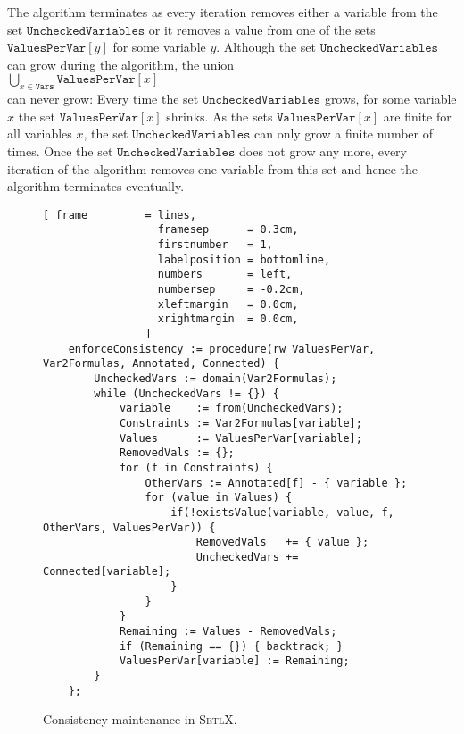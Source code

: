 The algorithm terminates as every iteration removes either a variable from the set
$\texttt{UncheckedVariables}$ or it removes a value from one of the sets $\texttt{ValuesPerVar}[y]$ for some
variable $y$.  Although the set $\texttt{UncheckedVariables}$ can grow during the algorithm,  the union
\\[0.2cm]
\hspace*{1.3cm}
$\bigcup\limits_{x \in \mathtt{Vars}} \texttt{ValuesPerVar}[x]$ 
\\[0.2cm]
can never grow:  Every time the set $\texttt{UncheckedVariables}$ grows,
for some variable $x$ the set $\texttt{ValuesPerVar}[x]$ shrinks.
As the sets $\texttt{ValuesPerVar}[x]$ are finite for all variables $x$, the set
$\texttt{UncheckedVariables}$ can only grow a finite number of times. 
Once the set $\texttt{UncheckedVariables}$ does not grow any more, every iteration of the algorithm removes one
variable from this set and hence the algorithm terminates eventually.

\begin{figure}[!ht]
\centering
\begin{Verbatim}[ frame         = lines, 
                  framesep      = 0.3cm, 
                  firstnumber   = 1,
                  labelposition = bottomline,
                  numbers       = left,
                  numbersep     = -0.2cm,
                  xleftmargin   = 0.0cm,
                  xrightmargin  = 0.0cm,
                ]
    enforceConsistency := procedure(rw ValuesPerVar, Var2Formulas, Annotated, Connected) {
        UncheckedVars := domain(Var2Formulas);
        while (UncheckedVars != {}) {
            variable    := from(UncheckedVars);
            Constraints := Var2Formulas[variable];
            Values      := ValuesPerVar[variable];
            RemovedVals := {};
            for (f in Constraints) {
                OtherVars := Annotated[f] - { variable };
                for (value in Values) {
                    if(!existsValue(variable, value, f, OtherVars, ValuesPerVar)) {
                        RemovedVals   += { value };
                        UncheckedVars += Connected[variable];
                    }
                }
            }
            Remaining := Values - RemovedVals;
            if (Remaining == {}) { backtrack; }
            ValuesPerVar[variable] := Remaining;
        }
    };
\end{Verbatim}
\vspace*{-0.3cm}
\caption{Consistency maintenance in \textsc{SetlX}.}
\label{fig:csp-consistency.stlx:enforceConsistency}
\end{figure}

